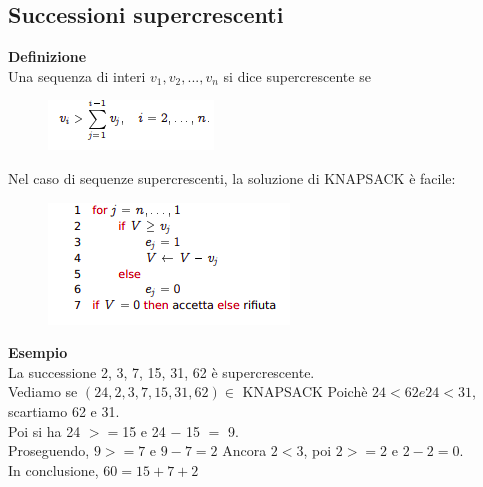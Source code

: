 \subsection{Successioni supercrescenti}
\textbf{Definizione}\\
Una sequenza di interi $v_1, v_2, ... , v_n$ si dice supercrescente se
\begin{figure}[htp]
    \centering
    \includegraphics[scale=0.9]{tesi_stile/img/foto4cap14.png}
\end{figure}
Nel caso di sequenze supercrescenti, la soluzione di KNAPSACK è facile:
\begin{figure}[htp]
    \includegraphics[scale=0.9]{tesi_stile/img/foto5cap14.png}
\end{figure}
\newpage
\textbf{Esempio}
\\La successione 2, 3, 7, 15, 31, 62 è supercrescente. 
\\Vediamo se $(24, 2, 3, 7, 15, 31, 62) \in$ KNAPSACK Poichè $24 < 62 e 24 < 31$, scartiamo 62 e 31.
\\Poi si ha 24 $>=$15 e 24 $-$ 15 $=$ 9.
\\Proseguendo, $9 >= 7$ e $9 - 7 = 2$ Ancora $2 < 3$, poi $2 >= 2$ e $2 - 2 = 0$.\\
In conclusione, $60 = 15 + 7 + 2$
